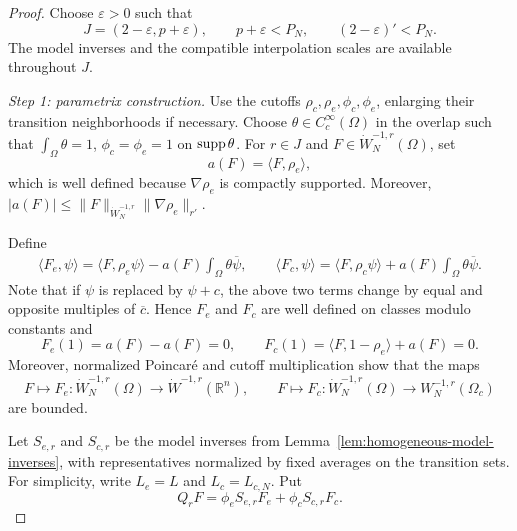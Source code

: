 \documentclass[12pt]{amsart}
\newcommand{\supp}{{\rm supp}{\hspace{.05cm}}}
\theoremstyle{remark}
\begin{document}
\begin{proof}
Choose \(\varepsilon>0\) such that
\[
 J=(2-\varepsilon,p+\varepsilon),
 \qquad p+\varepsilon<P_N,
 \qquad (2-\varepsilon)'<P_N.
\]
The model inverses and the compatible interpolation scales are available
throughout \(J\).

\emph{Step 1: parametrix construction.}
Use the cutoffs \(\rho_c,\rho_e,\phi_c,\phi_e\), enlarging their transition
neighborhoods if necessary.  Choose \(\theta\in C_c^\infty(\Omega)\) in
the overlap such that $\int_\Omega\theta=1$, $\phi_c=\phi_e=1$ on $\supp\theta$. For \(r\in J\) and \(F\in\dot W^{-1,r}_N(\Omega)\), set
\[
 a(F)=\langle F,\rho_e\rangle,
\]
which is well defined because \(\nabla\rho_e\) is compactly supported.
Moreover, $|a(F)|\leq \|F\|_{\dot W^{-1,r}_N} \|\nabla\rho_e\|_{r'}$.

Define 
\begin{align*}
 \langle F_e,\psi\rangle
 =\langle F,\rho_e\psi\rangle-a(F)\int_\Omega\theta\overline\psi, \qquad
 \langle F_c,\psi\rangle
 =\langle F,\rho_c\psi\rangle+a(F)\int_\Omega\theta\overline\psi.
\end{align*}
Note that if \(\psi\) is
replaced by \(\psi+c\), the above two terms change by equal and
opposite multiples of \(\overline c\).  Hence \(F_e\) and \(F_c\) are well defined on
classes modulo constants and
\[
 F_e(1)=a(F)-a(F)=0,
 \qquad
 F_c(1)=\langle F,1-\rho_e\rangle+a(F)=0.
\]
Moreover, normalized Poincar\'e and cutoff multiplication show that the maps
\[
 F\longmapsto F_e:
 \dot W^{-1,r}_N(\Omega)\longrightarrow
 \dot W^{-1,r}(\mathbb R^n),
 \qquad
 F\longmapsto F_c:
 \dot W^{-1,r}_N(\Omega)\longrightarrow
 W^{-1,r}_N(\Omega_c)
\]
are bounded.

Let \(S_{e,r}\) and \(S_{c,r}\) be the model inverses from
Lemma~\ref{lem:homogeneous-model-inverses}, with representatives normalized
by fixed averages on the transition sets.  For simplicity, write
\(L_e=L\) and \(L_c=L_{c,N}\).  Put
\[
 Q_rF=\phi_eS_{e,r}F_e+\phi_cS_{c,r}F_c.
\]


\end{proof}
\end{document}
